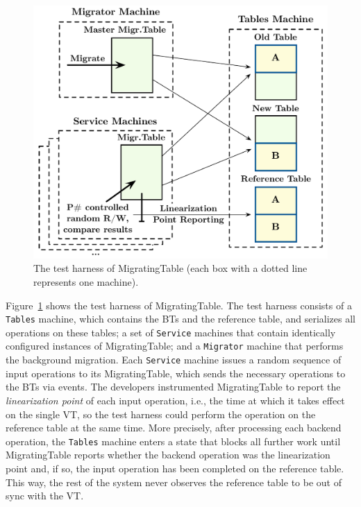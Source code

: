 \begin{figure}[t]
\centering
\includegraphics[width=\linewidth]{img/modeled_migration}
\vspace{-6mm}
\caption{The \psharp test harness of MigratingTable (each box with a dotted line represents one \psharp machine).}
\label{fig:mockedmigration}
\vspace{-2mm}
\end{figure}

Figure~\ref{fig:mockedmigration} shows the \psharp test harness of MigratingTable. The test harness consists of a \texttt{Tables} machine, which contains the BTs and the reference table, and serializes all operations on these tables; a set of \texttt{Service} machines that contain identically configured instances of MigratingTable; and a \texttt{Migrator} machine that performs the background migration. Each \texttt{Service} machine issues a random sequence of input operations to its MigratingTable, which sends the necessary operations to the BTs via \psharp events. The developers instrumented MigratingTable to report the \emph{linearization point} of each input operation, i.e., the time at which it takes effect on the single VT, so the test harness could perform the operation on the reference table at the same time. More precisely, after processing each backend operation, the \texttt{Tables} machine enters a \psharp state that blocks all further work until MigratingTable reports whether the backend operation was the linearization point and, if so, the input operation has been completed on the reference table. This way, the rest of the system never observes the reference table to be out of sync with the VT.

